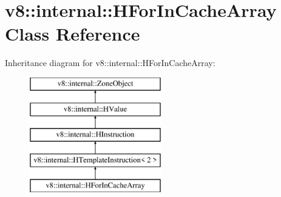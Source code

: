 \hypertarget{classv8_1_1internal_1_1_h_for_in_cache_array}{}\section{v8\+:\+:internal\+:\+:H\+For\+In\+Cache\+Array Class Reference}
\label{classv8_1_1internal_1_1_h_for_in_cache_array}
Inheritance diagram for v8\+:\+:internal\+:\+:H\+For\+In\+Cache\+Array\+:\begin{figure}[H]
\begin{center}
\leavevmode
\includegraphics[height=5.000000cm]{classv8_1_1internal_1_1_h_for_in_cache_array}
\end{center}
\end{figure}
